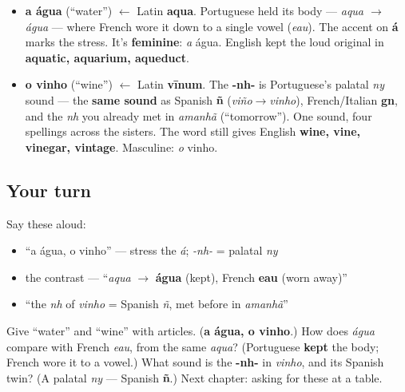 \begin{cousinweb}
\begin{itemize}
\raggedright
  \item \textbf{a água} (\textquotedblleft{}water\textquotedblright{}) $\leftarrow$ Latin \textbf{aqua}. Portuguese held its body — \emph{aqua $\to$ água} — where French wore it down to a single vowel (\emph{eau}). The accent on \textbf{á} marks the stress. It's \textbf{feminine}: \emph{a} água. English kept the loud original in \textbf{aquatic, aquarium, aqueduct}.
\end{itemize}
\end{cousinweb}

\begin{cousinweb}
\begin{itemize}
\raggedright
  \item \textbf{o vinho} (\textquotedblleft{}wine\textquotedblright{}) $\leftarrow$ Latin \textbf{vīnum}. The \textbf{-nh-} is Portuguese's palatal \emph{ny} sound — the \textbf{same sound} as Spanish \textbf{ñ} (\emph{viño}$\to$\emph{vinho}), French/Italian \textbf{gn}, and the \emph{nh} you already met in \emph{amanhã} (\textquotedblleft{}tomorrow\textquotedblright{}). One sound, four spellings across the sisters. The word still gives English \textbf{wine, vine, vinegar, vintage}. Masculine: \emph{o} vinho.
\end{itemize}
\end{cousinweb}

\subsection*{Your turn}
Say these aloud:

\begin{itemize}
\raggedright
  \item \textquotedblleft{}a água, o vinho\textquotedblright{} — stress the \emph{á}; \emph{-nh-} = palatal \emph{ny}
  \item the contrast — \textquotedblleft{}\emph{aqua} $\to$ \textbf{água} (kept), French \textbf{eau} (worn away)\textquotedblright{}
  \item \textquotedblleft{}the \emph{nh} of \emph{vinho} = Spanish \emph{ñ}, met before in \emph{amanhã}\textquotedblright{}
\end{itemize}

\begin{tcolorbox}[breakable,colback=teal!4,colframe=teal!35!black,title={Before you move on}]
Give \textquotedblleft{}water\textquotedblright{} and \textquotedblleft{}wine\textquotedblright{} with articles. (\textbf{a água, o vinho}.) How does \emph{água} compare with French \emph{eau}, from the same \emph{aqua}? (Portuguese \textbf{kept} the body; French wore it to a vowel.) What sound is the \textbf{-nh-} in \emph{vinho}, and its Spanish twin? (A palatal \emph{ny} — Spanish \textbf{ñ}.) Next chapter: asking for these at a table.
\end{tcolorbox}
